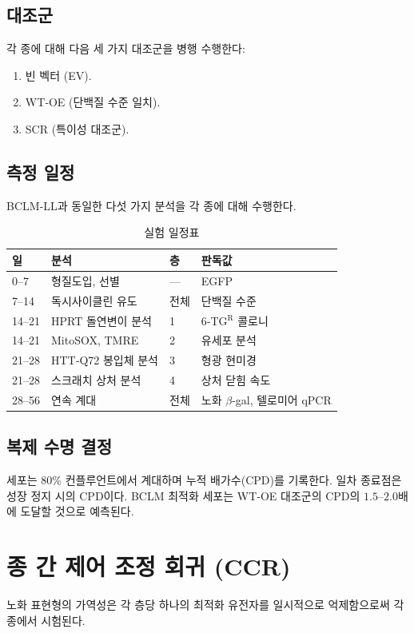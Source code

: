 \documentclass[12pt,a4paper]{article}
\begin{document}
	\subsection{대조군}
	각 종에 대해 다음 세 가지 대조군을 병행 수행한다:
	\begin{enumerate}
		\item 빈 벡터 (EV).
		\item WT‑OE (단백질 수준 일치).
		\item SCR (특이성 대조군).
	\end{enumerate}
	
	\subsection{측정 일정}
	BCLM‑LL과 동일한 다섯 가지 분석을 각 종에 대해 수행한다.
	
	\begin{table}[H]
		\centering
		\caption{실험 일정표}
		\label{tab:schedule}
		\begin{tabular}{@{}llll@{}}
			\toprule
			\textbf{일} & \textbf{분석} & \textbf{층} & \textbf{판독값} \\
			\midrule
			0–7   & 형질도입, 선별 & --- & EGFP \\
			7–14  & 독시사이클린 유도 & 전체 & 단백질 수준 \\
			14–21 & HPRT 돌연변이 분석 & 1 & 6‑TG\(^{\mathrm{R}}\) 콜로니 \\
			14–21 & MitoSOX, TMRE & 2 & 유세포 분석 \\
			21–28 & HTT‑Q72 봉입체 분석 & 3 & 형광 현미경 \\
			21–28 & 스크래치 상처 분석 & 4 & 상처 닫힘 속도 \\
			28–56 & 연속 계대 & 전체 & 노화 \(\beta\)-gal, 텔로미어 qPCR \\
			\bottomrule
		\end{tabular}
	\end{table}
	
	\subsection{복제 수명 결정}
	세포는 80\% 컨플루언트에서 계대하며 누적 배가수(CPD)를 기록한다. 일차 종료점은 성장 정지 시의 CPD이다. BCLM 최적화 세포는 WT‑OE 대조군의 CPD의 \(1.5\)–\(2.0\)배에 도달할 것으로 예측된다.
	
	\section{종 간 제어 조정 회귀 (CCR)}
	\label{sec:CCR}
	노화 표현형의 가역성은 각 층당 하나의 최적화 유전자를 일시적으로 억제함으로써 각 종에서 시험된다.
	
\end{document}
